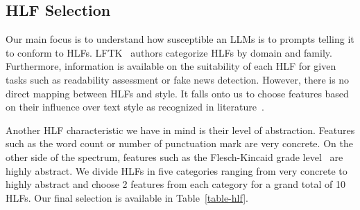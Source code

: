\documentclass[runningheads,a4paper,11pt]{article}
\begin{document}
\subsection{HLF Selection}\label{hlf-selection}

Our main focus is to understand how susceptible an LLMs is to prompts telling it
to conform to HLFs.
LFTK~\cite{lftk-2023} authors categorize HLFs by domain and family.
Furthermore, information is available on the suitability of each HLF for given
tasks such as readability assessment or fake news detection.
However, there is no direct mapping between HLFs and style.
It falls onto us to choose features based on their influence over text style as
recognized in literature~\cite{verma2019lexical,lugea2023stylistics}.

Another HLF characteristic we have in mind is their level of abstraction.
Features such as the word count or number of punctuation mark are very concrete.
On the other side of the spectrum, features such as the Flesch-Kincaid grade
level~\cite{kincaid1975derivation} are highly abstract.
We divide HLFs in five categories ranging from very concrete to highly abstract
and choose 2 features from each category for a grand total of 10 HLFs.
Our final selection is available in Table~\ref{table-hlf}.
\end{document}
